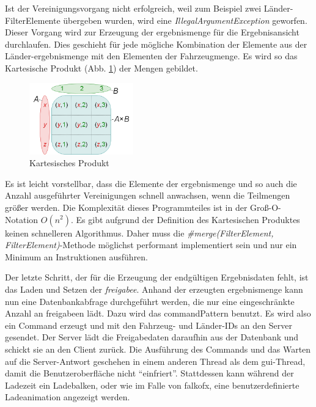 Ist der Vereinigungsvorgang nicht erfolgreich, weil zum Beispiel zwei Länder-Filter\-Ele\-men\-te übergeben wurden, wird eine \textit{IllegalArgumentException} geworfen.
Dieser Vorgang wird zur Erzeugung der \gls{ergebnismenge} für die Ergebnisansicht durchlaufen. Dies geschieht für jede mögliche Kombination der Elemente aus der Länder-\gls{ergebnismenge} mit den Elementen der Fahrzeugmenge. Es wird so das Kartesische Produkt (Abb. \ref{fig:multiFilter4}) der Mengen gebildet.

\begin{figure}[H]
 \centering
 \includegraphics[width=0.4\textwidth]{grafiken/Multi_Kartesisches.png}
 \caption{Kartesisches Produkt \cite{Wikipedia}}
 \label{fig:multiFilter4}
\end{figure}

Es ist leicht vorstellbar, dass die Elemente der \gls{ergebnismenge} und so auch die Anzahl ausgeführter Vereinigungen schnell anwachsen, wenn die Teilmengen größer werden. Die Komplexität dieses Programmteiles ist in der Groß-O-Notation $O(n^2)$. Es gibt aufgrund der Definition des Kartesischen Produktes keinen schnelleren Algorithmus. Daher muss die \textit{\#merge(FilterElement, FilterElement)}-Methode möglichst performant implementiert sein und nur ein Minimum an Instruktionen ausführen.

Der letzte Schritt, der für die Erzeugung der endgültigen Ergebnisdaten fehlt, ist das Laden und Setzen der \textit{\gls{freigabe}e}. Anhand der erzeugten \gls{ergebnismenge} kann nun eine Datenbankabfrage durchgeführt werden, die nur eine eingeschränkte Anzahl an \gls{freigabe}en lädt. Dazu wird das \gls{commandPattern} benutzt. Es wird also ein Command erzeugt und mit den Fahrzeug- und Länder-IDs an den Server gesendet. Der Server lädt die Freigabedaten daraufhin aus der Datenbank und schickt sie an den Client zurück. Die Ausführung des Commands und das Warten auf die Server-Antwort geschehen in einem anderen Thread als dem \gls{gui}-Thread, damit die Benutzeroberfläche nicht \enquote{einfriert}. Stattdessen kann während der Ladezeit ein Ladebalken, oder wie im Falle von \gls{falkofx}, eine benutzerdefinierte Ladeanimation angezeigt werden.

